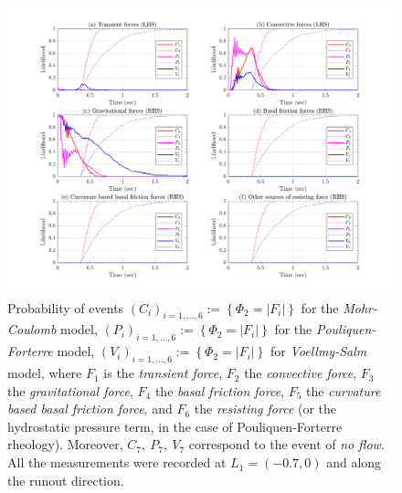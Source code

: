 \documentclass{article}
\begin{document}
\begin{figure}[H]
        \centering
        \includegraphics[width=1\textwidth]{InclinedPlane/LocalRecords/DominancePrX_L1.png}
        \caption{Probability of events $(C_i)_{i=1,...,6}:=\left\{\Phi_2=|F_i|\right\}$ for the \emph{Mohr-Coulomb} model, $(P_i)_{i=1,...,6}:=\left\{\Phi_2=|F_i|\right\}$ for the \emph{Pouliquen-Forterre} model, $(V_i)_{i=1,...,6}:=\left\{\Phi_2=|F_i|\right\}$ for \emph{Voellmy-Salm} model, where $F_1$ is the \emph{transient force}, $F_2$ the \emph{convective force}, $F_3$ the \emph{gravitational force}, $F_4$ the \emph{basal friction force}, $F_5$ the \emph{curvature based basal friction force}, and $F_6$ the \emph{resisting force} (or the hydrostatic pressure term, in the case of Pouliquen-Forterre rheology). Moreover, $C_7,\ P_7,\ V_7$ correspond to the event of \emph{no flow}. All the measurements were recorded at $L_1=(-0.7,0)$ and along the runout direction.}
        \label{fig:Ramp-FXDominance-L1}
\end{figure}
\end{document}
